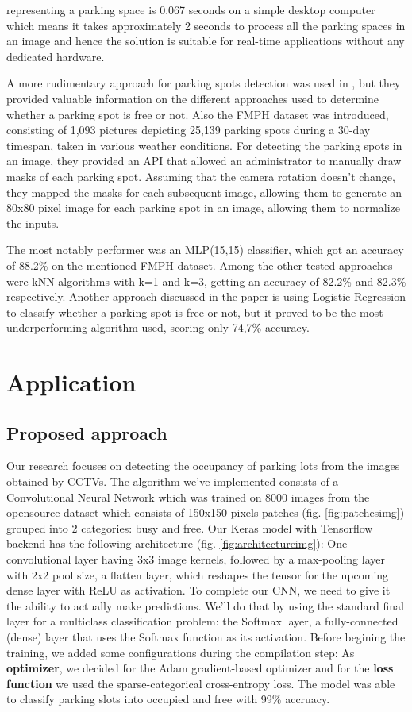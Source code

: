 \documentclass[12pt]{article}
\begin{document}
representing a parking space is 0.067 seconds on a simple desktop computer 
which means it takes approximately 2 seconds to process all the parking 
spaces in an image and hence the solution is suitable for real-time 
applications without any dedicated hardware.
\par
A more rudimentary approach for parking spots detection was used in \cite{roman},
but they provided valuable information on the different approaches used
to determine whether a parking spot is free or not. Also the FMPH dataset
was introduced, consisting of 1,093 pictures depicting 25,139 parking
spots during a 30-day timespan, taken in various weather conditions.
For detecting the parking spots in an image, they provided an API that
allowed an administrator to manually draw masks of each parking spot.
Assuming that the camera rotation doesn't change, they mapped the masks
for each subsequent image, allowing them to generate an 80x80 pixel
image for each parking spot in an image, allowing them to normalize
the inputs.
\par
The most notably performer was an MLP(15,15) classifier, which got an accuracy
of 88.2\% on the mentioned FMPH dataset. Among the other tested approaches
were kNN algorithms with k=1 and k=3, getting an accuracy of 82.2\% and
82.3\% respectively. Another approach discussed in the paper is using
Logistic Regression to classify whether a parking spot is free or not,
but it proved to be the most underperforming algorithm used, scoring
only 74,7\% accuracy.

\section{Application}

\subsection{Proposed approach}
Our research focuses on detecting the occupancy of parking lots from the images obtained by CCTVs.
The algorithm we've implemented consists of a Convolutional Neural Network which was trained on 8000 images from the opensource 
\cite{cnrpark} dataset which consists of 150x150 pixels patches (fig. \ref{fig:patchesimg}) grouped into 2 categories: busy and free.
Our Keras model with Tensorflow backend has the following architecture (fig. \ref{fig:architectureimg}): One convolutional layer having 3x3 image kernels,
followed by a max-pooling layer with 2x2 pool size, a flatten layer, which reshapes the tensor for the upcoming dense layer 
with ReLU as activation. To complete our CNN, we need to give it the ability to actually make predictions. 
We’ll do that by using the standard final layer for a multiclass classification problem: 
the Softmax layer, a fully-connected (dense) layer that uses the Softmax function as its activation.
Before begining the training, we added some configurations during the compilation step:
As \textbf{optimizer}, we decided for the Adam gradient-based optimizer and for the \textbf{loss function} 
we used the sparse-categorical cross-entropy loss. The model was able to classify parking slots into occupied and free with 99\% accruacy.
\end{document}
